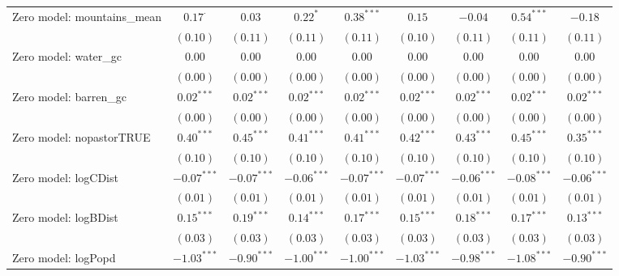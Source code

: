 \begin{sidewaystable}
\begin{center}
{\begin{tabular}{l c c c c c c c c}
Zero model: mountains\_mean    & $0.17^{\cdot}$ & $0.03$        & $0.22^{*}$    & $0.38^{***}$  & $0.15$        & $-0.04$       & $0.54^{***}$  & $-0.18$       \\
                               & $(0.10)$       & $(0.11)$      & $(0.11)$      & $(0.11)$      & $(0.10)$      & $(0.11)$      & $(0.11)$      & $(0.11)$      \\
Zero model: water\_gc          & $0.00$         & $0.00$        & $0.00$        & $0.00$        & $0.00$        & $0.00$        & $0.00$        & $0.00$        \\
                               & $(0.00)$       & $(0.00)$      & $(0.00)$      & $(0.00)$      & $(0.00)$      & $(0.00)$      & $(0.00)$      & $(0.00)$      \\
Zero model: barren\_gc         & $0.02^{***}$   & $0.02^{***}$  & $0.02^{***}$  & $0.02^{***}$  & $0.02^{***}$  & $0.02^{***}$  & $0.02^{***}$  & $0.02^{***}$  \\
                               & $(0.00)$       & $(0.00)$      & $(0.00)$      & $(0.00)$      & $(0.00)$      & $(0.00)$      & $(0.00)$      & $(0.00)$      \\
Zero model: nopastorTRUE       & $0.40^{***}$   & $0.45^{***}$  & $0.41^{***}$  & $0.41^{***}$  & $0.42^{***}$  & $0.43^{***}$  & $0.45^{***}$  & $0.35^{***}$  \\
                               & $(0.10)$       & $(0.10)$      & $(0.10)$      & $(0.10)$      & $(0.10)$      & $(0.10)$      & $(0.10)$      & $(0.10)$      \\
Zero model: logCDist           & $-0.07^{***}$  & $-0.07^{***}$ & $-0.06^{***}$ & $-0.07^{***}$ & $-0.07^{***}$ & $-0.06^{***}$ & $-0.08^{***}$ & $-0.06^{***}$ \\
                               & $(0.01)$       & $(0.01)$      & $(0.01)$      & $(0.01)$      & $(0.01)$      & $(0.01)$      & $(0.01)$      & $(0.01)$      \\
Zero model: logBDist           & $0.15^{***}$   & $0.19^{***}$  & $0.14^{***}$  & $0.17^{***}$  & $0.15^{***}$  & $0.18^{***}$  & $0.17^{***}$  & $0.13^{***}$  \\
                               & $(0.03)$       & $(0.03)$      & $(0.03)$      & $(0.03)$      & $(0.03)$      & $(0.03)$      & $(0.03)$      & $(0.03)$      \\
Zero model: logPopd            & $-1.03^{***}$  & $-0.90^{***}$ & $-1.00^{***}$ & $-1.00^{***}$ & $-1.03^{***}$ & $-0.98^{***}$ & $-1.08^{***}$ & $-0.90^{***}$ \\

\end{tabular}}
\end{center}
\end{sidewaystable}
